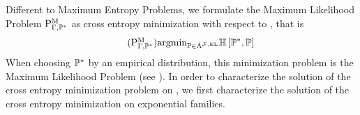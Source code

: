 
Different to Maximum Entropy Problems, we formulate the Maximum Likelihood Problem $\mathrm{P}^{\mathrm{M}}_{\Gamma,\mathbb{P}^*}$ as cross entropy minimization with respect to \HybridLogicNetworks{}, that is
\begin{align}
    \tag{$\probtagtypeinst{\mathrm{M}}{\Gamma,\gendistribution}$}\label{prob:minCrossEntropyHLN}
    \argmin_{\probtensor\in\elrealizabledistsof{\mlnstat}} \centropyof{\gendistribution}{\probtensor}
\end{align}
When choosing $\mathbb{P}^*$ by an empirical distribution, this minimization problem is the Maximum Likelihood Problem (see ).
In order to characterize the solution of the cross entropy minimization problem on \HybridLogicNetworks{}, we first characterize the solution of the cross entropy minimization on exponential families.


